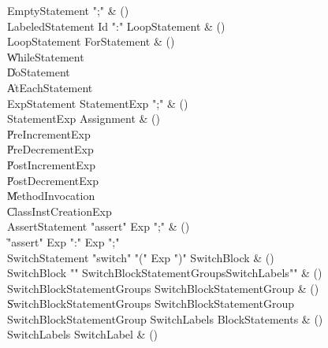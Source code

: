 \begin{bbgrammar}

 EmptyStatement  \label{prod:EmptyStatement}  \: \xcd";" & ()\\
 LabeledStatement  \label{prod:LabeledStatement}  \: Id \xcd":" LoopStatement & ()\\
 LoopStatement  \label{prod:LoopStatement}  \: ForStatement & ()\\
    \| WhileStatement\\
    \| DoStatement\\
    \| AtEachStatement\\
 ExpStatement  \label{prod:ExpStatement}  \: StatementExp \xcd";" & ()\\
 StatementExp  \label{prod:StatementExp}  \: Assignment & ()\\
    \| PreIncrementExp\\
    \| PreDecrementExp\\
    \| PostIncrementExp\\
    \| PostDecrementExp\\
    \| MethodInvocation\\
    \| ClassInstCreationExp\\
 AssertStatement  \label{prod:AssertStatement}  \: \xcd"assert" Exp \xcd";" & ()\\
    \| \xcd"assert" Exp  \xcd":" Exp  \xcd";"\\
 SwitchStatement  \label{prod:SwitchStatement}  \: \xcd"switch" \xcd"(" Exp \xcd")" SwitchBlock & ()\\
 SwitchBlock  \label{prod:SwitchBlock}  \: \xcd"{" SwitchBlockStatementGroups\opt SwitchLabels\opt \xcd"}" & ()\\
 SwitchBlockStatementGroups  \label{prod:SwitchBlockStatementGroups}  \: SwitchBlockStatementGroup & ()\\
    \| SwitchBlockStatementGroups SwitchBlockStatementGroup\\
 SwitchBlockStatementGroup  \label{prod:SwitchBlockStatementGroup}  \: SwitchLabels BlockStatements & ()\\
 SwitchLabels  \label{prod:SwitchLabels}  \: SwitchLabel & ()\\

\end{bbgrammar}
